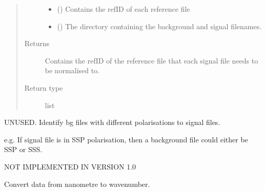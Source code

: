 \documentclass[a4paper,10pt,english]{sphinxmanual}
\begin{document}
\begin{fulllineitems}
\begin{fulllineitems}
\begin{quote}
\begin{description}
\begin{itemize}
\item {} 
\sphinxAtStartPar
{} () \textendash{} Contains the refID of each reference file

\item {} 
\sphinxAtStartPar
{} () \textendash{} The directory containing the background and signal filenames.

\end{itemize}

\item[{Returns}] \leavevmode
\sphinxAtStartPar
{} \textendash{} Contains the refID of the reference file that each signal file needs to be normalised to.

\item[{Return type}] \leavevmode
\sphinxAtStartPar
list

\end{description}\end{quote}

\end{fulllineitems}


\begin{fulllineitems}
\label{\detokenize{sfgtools:sfgtools.SFGProcessTools.match_polarisations_bg}}
\sphinxAtStartPar
UNUSED. Identify bg files with different polarisations to signal files.

\sphinxAtStartPar
e.g. If signal file is in SSP polarisation, then a background file could either be SSP or SSS.

\sphinxAtStartPar
NOT IMPLEMENTED IN VERSION 1.0

\end{fulllineitems}


\begin{fulllineitems}
\label{\detokenize{sfgtools:sfgtools.SFGProcessTools.nm_to_cm}}
\sphinxAtStartPar
Convert data from nanometre to wavenumber.


\end{fulllineitems}
\end{fulllineitems}
\end{document}
